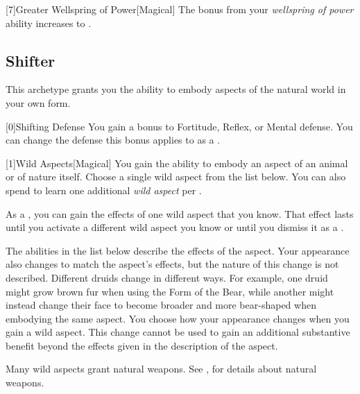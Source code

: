         [7]{Greater Wellspring of Power}[Magical]
        The bonus from your \textit{wellspring of power} ability increases to .

    \newpage
    \subsection{Shifter}\label{Shifter}
        This archetype grants you the ability to embody aspects of the natural world in your own form.

        [0]{Shifting Defense} You gain a  bonus to Fortitude, Reflex, or Mental defense.
        You can change the defense this bonus applies to as a .

        [1]{Wild Aspects}[Magical]
        You gain the ability to embody an aspect of an animal or of nature itself.
        Choose a single wild aspect from the list below.
        You can also spend  to learn one additional \textit{wild aspect} per .

        As a , you can gain the effects of one wild aspect that you know.
        That effect lasts until you activate a different wild aspect you know or until you dismiss it as a .

        The abilities in the list below describe the effects of the aspect.
        Your appearance also changes to match the aspect's effects, but the nature of this change is not described.
        Different druids change in different ways.
        For example, one druid might grow brown fur when using the Form of the Bear, while another might instead change their face to become broader and more bear-shaped when embodying the same aspect.
        You choose how your appearance changes when you gain a wild aspect.
        This change cannot be used to gain an additional substantive benefit beyond the effects given in the description of the aspect.

        Many wild aspects grant natural weapons.
        See , for details about natural weapons.

